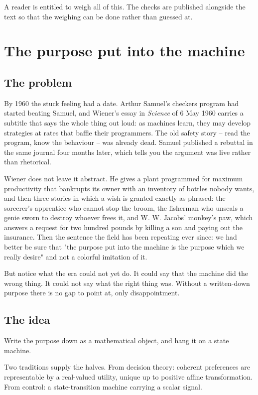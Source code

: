 A reader is entitled to weigh all of this. The checks are published alongside the text so that the weighing can be done rather than guessed at.

\chapter{The purpose put into the machine}

\section*{The problem}

By 1960 the stuck feeling had a date. Arthur Samuel's checkers program had started beating Samuel, and Wiener's essay in \emph{Science} of 6 May 1960 carries a subtitle that says the whole thing out loud: as machines learn, they may develop strategies at rates that baffle their programmers. The old safety story -- read the program, know the behaviour -- was already dead. Samuel published a rebuttal in the same journal four months later, which tells you the argument was live rather than rhetorical.

Wiener does not leave it abstract. He gives a plant programmed for maximum productivity that bankrupts its owner with an inventory of bottles nobody wants, and then three stories in which a wish is granted exactly as phrased: the sorcerer's apprentice who cannot stop the broom, the fisherman who unseals a genie sworn to destroy whoever frees it, and W. W. Jacobs' monkey's paw, which answers a request for two hundred pounds by killing a son and paying out the insurance. Then the sentence the field has been repeating ever since: we had better be sure that "the purpose put into the machine is the purpose which we really desire" and not a colorful imitation of it.

But notice what the era could not yet do. It could say that the machine did the wrong thing. It could not say what the right thing was. Without a written-down purpose there is no gap to point at, only disappointment.

\section*{The idea}

Write the purpose down as a mathematical object, and hang it on a state machine.

Two traditions supply the halves. From decision theory: coherent preferences are representable by a real-valued utility, unique up to positive affine transformation. From control: a state-transition machine carrying a scalar signal.

